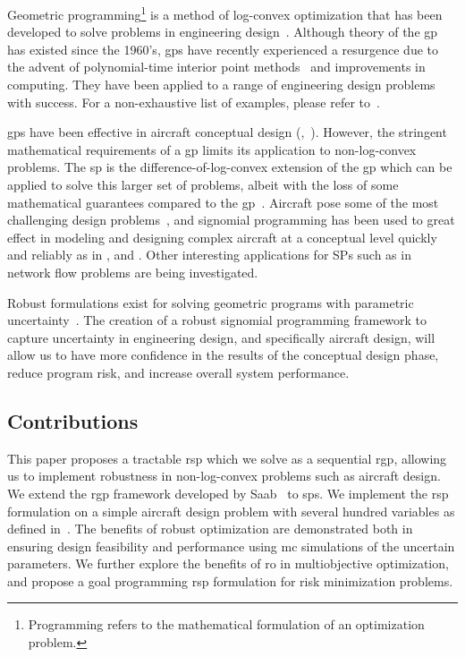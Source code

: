 Geometric programming\footnote{Programming refers to the mathematical formulation of an optimization problem.}
is a method of log-convex optimization that has been developed
to solve problems in engineering design~\cite{Duffin1967}. Although theory of the \gls{gp} has existed since
the 1960's, \gls{gp}s have recently experienced a resurgence due to the advent of polynomial-time
interior point methods~\cite{Nesterov1994} and improvements in computing. They have been
applied to a range of engineering design problems with success. For a non-exhaustive list of examples,
please refer to~\cite{Boyd2007}.

\gls{gp}s have been effective in aircraft conceptual design
(\cite{Hoburg2013},~\cite{Burton2017}).
However, the stringent mathematical requirements of a \gls{gp} limits its application to non-log-convex problems.
The \gls{sp} is the difference-of-log-convex extension of the \gls{gp} which can be applied to
solve this larger set of problems, albeit with the loss of some mathematical guarantees compared to the \gls{gp}~\cite{Kirschen2018}.
Aircraft pose some of the most challenging design problems~\cite{York2018}, and signomial programming
has been used to great effect in modeling and designing complex aircraft at a conceptual level quickly
and reliably as in \cite{York2018}, \cite{Kirschen2016} and \cite{Kirschen2018}.
Other interesting applications for SPs such as in network flow problems are being investigated.

Robust formulations exist for solving geometric programs with parametric uncertainty~\cite{Saab2018}.
The creation of a robust signomial programming framework to capture uncertainty in engineering
design, and specifically aircraft design, will allow us to have more confidence in the results
of the conceptual design phase, reduce program risk, and increase overall system performance.

\subsection{Contributions}

This paper proposes a tractable \gls{rsp} which we solve as a sequential \gls{rgp},
allowing us to implement robustness in non-log-convex problems such as aircraft design.
We extend the \gls{rgp} framework developed by Saab~\cite{Saab2018} to \gls{sp}s.
We implement the \gls{rsp} formulation on a simple aircraft design problem with several hundred
variables as defined in~\cite{Ozturk2018}.
The benefits of robust optimization are demonstrated both in ensuring design feasibility and performance
using \gls{mc} simulations of the uncertain parameters.
We further explore the benefits of \gls{ro} in multiobjective optimization, and propose
a goal programming \gls{rsp} formulation for risk minimization problems.



